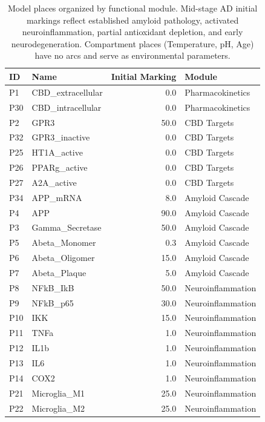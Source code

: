 \documentclass[10pt,letterpaper]{article}
\begin{document}
\begin{table}[htbp]
\centering
\caption{Model places organized by functional module. Mid-stage AD initial markings reflect established amyloid pathology, activated neuroinflammation, partial antioxidant depletion, and early neurodegeneration. Compartment places (Temperature, pH, Age) have no arcs and serve as environmental parameters.}
\label{tab:places}
\begin{tabular}{llrl}
\toprule
ID & Name & Initial Marking & Module \\
\midrule
P1  & CBD\_extracellular   & 0.0    & Pharmacokinetics \\
P30 & CBD\_intracellular   & 0.0    & Pharmacokinetics \\
P2  & GPR3                 & 50.0   & CBD Targets \\
P32 & GPR3\_inactive       & 0.0    & CBD Targets \\
P25 & HT1A\_active         & 0.0    & CBD Targets \\
P26 & PPARg\_active        & 0.0    & CBD Targets \\
P27 & A2A\_active          & 0.0    & CBD Targets \\
P34 & APP\_mRNA            & 8.0    & Amyloid Cascade \\
P4  & APP                  & 90.0   & Amyloid Cascade \\
P3  & Gamma\_Secretase     & 50.0   & Amyloid Cascade \\
P5  & Abeta\_Monomer       & 0.3    & Amyloid Cascade \\
P6  & Abeta\_Oligomer      & 15.0   & Amyloid Cascade \\
P7  & Abeta\_Plaque        & 5.0    & Amyloid Cascade \\
P8  & NFkB\_IkB            & 50.0   & Neuroinflammation \\
P9  & NFkB\_p65            & 30.0   & Neuroinflammation \\
P10 & IKK                  & 15.0   & Neuroinflammation \\
P11 & TNFa                 & 1.0    & Neuroinflammation \\
P12 & IL1b                 & 1.0    & Neuroinflammation \\
P13 & IL6                  & 1.0    & Neuroinflammation \\
P14 & COX2                 & 1.0    & Neuroinflammation \\
P21 & Microglia\_M1        & 25.0   & Neuroinflammation \\
P22 & Microglia\_M2        & 25.0   & Neuroinflammation \\

\end{tabular}
\end{table}
\end{document}
